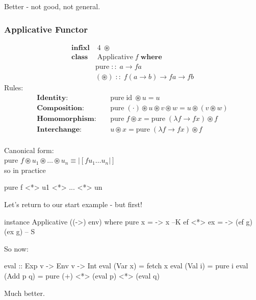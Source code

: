 \documentclass[18pt]{beamer}
\begin{document}
\begin{frame}[fragile]
Better - not good, not general.
\end{frame}

\begin{frame}[fragile] \frametitle{Applicative Functor}

\begin{align*}
  \mathbf{infixl} & \; 4 \; \circledast\\
  \mathbf{class} & \; \mathrm{Applicative} \; f \; \mathbf{where}\\
  \quad & \mathrm{pure} \; :: \; a \rightarrow f a\\
  \quad & (\circledast) \; :: \; f (a \rightarrow b) \rightarrow f a
\rightarrow f b
\end{align*}
Rules:
\begin{align*}
  \mathbf{Identity:} \quad & \mathrm{pure} \; \mathrm{id} \;
  \circledast u = u\\
  \mathbf{Composition:} \quad & \mathrm{pure} \; (\cdot) \circledast u
  \circledast v \circledast w = u \circledast (v \circledast w)\\
  \mathbf{Homomorphism:} \quad & \mathrm{pure} \; f \circledast x =
  \mathrm{pure} \; (\lambda f \rightarrow f x) \circledast f\\
  \mathbf{Interchange:} \quad & u \circledast x = \mathrm{pure} \;
  (\lambda f \rightarrow f x) \circledast f\\
\end{align*}
\end{frame}

\begin{frame}[fragile]
Canonical form:\\
pure $f \circledast u_1 \circledast \ldots \circledast u_n \equiv |[f u_1 \ldots u_n|]$\\
so in practice\\
\begin{code}
pure f <*> u1 <*> ... <*> un
\end{code}
\end{frame}

\begin{frame}[fragile]
Let's return to our start example - but first!\\
\begin{code}
instance Applicative ((->) env) where
pure x = \g -> x --K
ef <*> ex = \g -> (ef g)(ex g) -- S
\end{code}

So now:
\begin{code}
eval :: Exp v -> Env v -> Int
eval (Var x) = fetch x
eval (Val i) = pure i
eval (Add p q) = pure (+) <*>  (eval p) <*> (eval q)
\end{code}
Much better.

\end{frame}

\begin{frame}

\end{frame}
\end{document}
